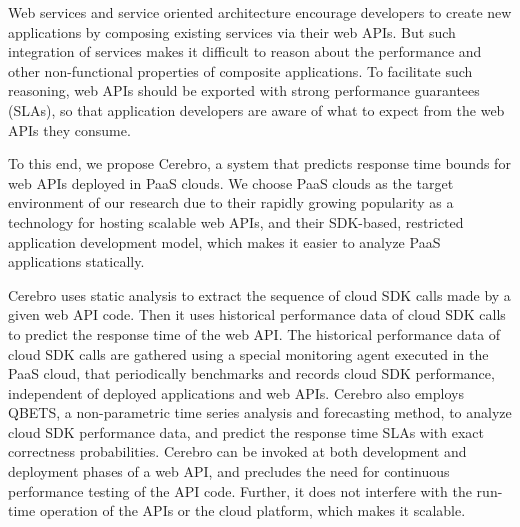 Web services and service oriented architecture encourage developers to create new applications by
composing existing services via their web APIs. But such integration of services makes it difficult to
reason about the performance and other non-functional properties of 
composite applications. To
facilitate such reasoning, web APIs should be exported with strong performance 
guarantees (SLAs), so that application developers are aware of 
what to expect from the web APIs they consume. 

To this end,
we propose Cerebro, a system that predicts response time 
bounds for web APIs deployed in PaaS clouds. We
choose PaaS clouds as the target environment of our 
research due to their rapidly growing popularity as a technology
for hosting scalable web APIs, and their SDK-based, restricted 
application development model, 
which makes it easier to analyze PaaS applications statically.

Cerebro uses static analysis to extract the sequence of cloud SDK 
calls made by a given web API code. Then it
uses historical performance data of cloud SDK calls to predict the response time of the web
API. The historical performance data of cloud SDK 
calls are gathered using a special monitoring agent
executed in the PaaS cloud, that periodically benchmarks and records 
cloud SDK performance, independent of deployed applications and web APIs.
Cerebro also employs QBETS, a non-parametric time series analysis and 
forecasting method, to analyze
cloud SDK performance data, and predict the response time SLAs with exact correctness
probabilities. Cerebro can be invoked at both development and 
deployment phases of a web API, and 
precludes the need for continuous performance testing of the API code. 
Further, it does not interfere with the run-time operation
of the APIs or the cloud platform, which makes it scalable.


